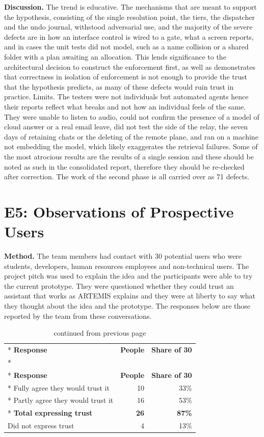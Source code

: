 \documentclass{FastFyp}
\begin{document}
\textbf{Discussion.} The trend is educative. The mechanisms that are meant to support the hypothesis, consisting of the single resolution point, the tiers, the dispatcher and the undo journal, withstood adversarial use, and the majority of the severe defects are in how an interface control is wired to a gate, what a screen reports, and in cases the unit tests did not model, such as a name collision or a shared folder with a plan awaiting an allocation. This lends significance to the architectural decision to construct the enforcement first, as well as demonstrates that correctness in isolation of enforcement is not enough to provide the trust that the hypothesis predicts, as many of these defects would ruin trust in practice. Limits. The testers were not individuals but automated agents hence their reports reflect what breaks and not how an individual feels of the same. They were unable to listen to audio, could not confirm the presence of a model of cloud answer or a real email leave, did not test the side of the relay, the seven days of retaining chats or the deleting of the remote plane, and ran on a machine not embedding the model, which likely exaggerates the retrieval failures. Some of the most atrocious results are the results of a single session and these should be noted as such in the consolidated report, therefore they should be re-checked after correction. The work of the second phase is all carried over as 71 defects.

\section{E5: Observations of Prospective Users}
\textbf{Method.} The team members had contact with 30 potential users who were students, developers, human resources employees and non-technical users. The project pitch was used to explain the idea and the participants were able to try the current prototype. They were questioned whether they could trust an assistant that works as ARTEMIS explains and they were at liberty to say what they thought about the idea and the prototype. The responses below are those reported by the team from these conversations.

{
\begin{longtable}{|p{6.4cm}|r|r|}
\caption{Stated trust, 30 prospective users.}\label{tab:obs}\\*
\hline
\textbf{Response} & \textbf{People} & \textbf{Share of 30} \\*
\hline
\endfirsthead
\caption[]{continued from previous page}\\*
\hline
\textbf{Response} & \textbf{People} & \textbf{Share of 30} \\*
\hline
\endhead
\hline
Fully agree they would trust it & 10 & 33\% \\*
\hline
Partly agree they would trust it & 16 & 53\% \\*
\hline
\textbf{Total expressing trust} & \textbf{26} & \textbf{87\%} \\
\hline
Did not express trust & 4 & 13\% \\
\hline
\end{longtable}
}
\end{document}

